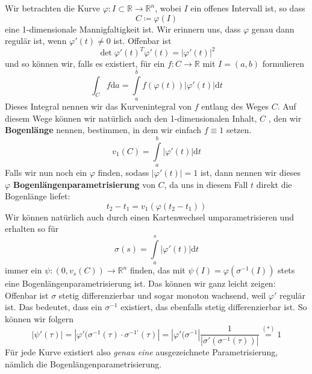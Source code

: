 \begin{beispiel}[Kurvenintegral]
Wir betrachten die Kurve $\varphi:I\subset\mathbb{R}\rightarrow\mathbb{R}^n$, 
wobei $I$ ein offenes Intervall ist, so dass
\begin{equation*}
	C\coloneqq\varphi(I)
\end{equation*}
eine 1-dimensionale Mannigfaltigkeit ist. Wir erinnern uns, dass $\varphi$ 
genau dann regulär ist, wenn $\varphi'(t)\neq 0$ ist. Offenbar ist 
\begin{equation*}
	\det \varphi'(t)^T\varphi'(t)=|\varphi'(t)|^2
\end{equation*}
und so können wir, falls es existiert, für ein $f:C\rightarrow\mathbb{R}$ 
mit $I=(a,b)$ formulieren
\begin{equation}
 \int_Cf\mathrm{d}a=\int\limits_a^bf(\varphi(t))|\varphi'(t)|\mathrm{d}t
\end{equation}
Dieses Integral nennen wir das Kurvenintegral von $f$ entlang des Weges $C$. 
Auf diesem Wege können wir natürlich auch den 1-dimensionalen Inhalt, $C$ 
, den wir \textbf{Bogenlänge} nennen, bestimmen, in dem wir einfach $f\equiv 1$ setzen.
\begin{equation}
	v_1(C)=\int\limits_a^b|\varphi'(t)|\mathrm{d}t
\end{equation}
Falls wir nun noch ein $\varphi$ finden, sodass $|\varphi'(t)|=1$ ist, 
dann nennen wir dieses $\varphi$ \textbf{Bogenlängenparametrisierung} 
von $C$, da uns in diesem Fall $t$ direkt die Bogenlänge liefet:
\begin{equation*}
	t_2-t_1=v_1(\varphi(t_2-t_1))
\end{equation*}
Wir können natürlich auch durch einen Kartenwechsel umparametrisieren 
und erhalten so für 
\begin{equation*}
	\sigma(s)=\int\limits_a^s|\varphi'(t)|\mathrm{d}t 
	\tag{$\ast$}
\end{equation*}
immer ein $\psi:(0,v_s(C))\rightarrow\mathbb{R}^n$ finden, 
das mit $\psi(I)=\varphi(\sigma^{-1}(I))$ stets eine Bogenlängenparametrisierung 
ist. Das können wir ganz leicht zeigen:\\
Offenbar ist $\sigma$ stetig differenzierbar und sogar monoton wachsend, 
weil $\varphi'$ regulär ist. Das bedeutet, dass ein $\sigma^{-1}$ 
existiert, das ebenfalls stetig differenzierbar ist. 
So können wir folgern
\begin{equation*}
	|\psi'(\tau)| = 
	\left| \varphi' ( \sigma^{-1} (\tau)\cdot\sigma^{-1'} (\tau)\right|= 
	\left| \varphi' ( \sigma^{-1}\right|\frac{1}{|\sigma'(\sigma^{-1}(\tau))|} 
	\overset{(\ast)} = 1
\end{equation*}
Für jede Kurve existiert also \emph{genau eine} ausgezeichnete Parametrisierung, 
nämlich die Bogenlängenparametrisierung.
\end{beispiel}
